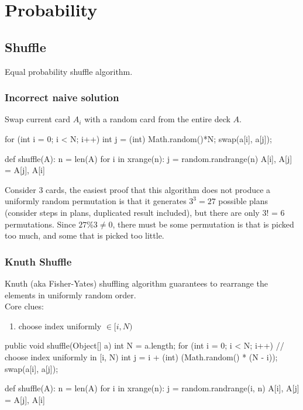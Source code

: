 \chapter{Probability}


\section{Shuffle}
Equal probability shuffle algorithm.

\subsection{Incorrect naive solution}
Swap current card $A_i$ with a random card from the entire deck $A$. 
\begin{java}
for (int i = 0; i < N; i++) {
   int j = (int) Math.random()*N;
   swap(a[i], a[j]);
}
\end{java}
\begin{python}
def shuffle(A):
  n = len(A)
  for i in xrange(n):
    j = random.randrange(n)
    A[i], A[j] = A[j], A[i]
\end{python}
Consider 3 cards, the easiest proof that this algorithm does not produce a uniformly random permutation is that it generates $3^3=27$ possible plans (consider steps in plans, duplicated result included), but there are only 3! = 6 permutations. Since $27\%3 \neq 0$, there must be some permutation is that is picked too much, and some that is picked too little.
\subsection{Knuth Shuffle}
Knuth (aka Fisher-Yates) shuffling algorithm guarantees to rearrange the elements in uniformly random order. 
\\
Core clues:
\begin{enumerate}
\item choose index uniformly $\in [i, N)$
\end{enumerate}
\begin{java}
public void shuffle(Object[] a) {
    int N = a.length;
    for (int i = 0; i < N; i++) {
        // choose index uniformly in [i, N)
        int j = i + (int) (Math.random() * (N - i));
        swap(a[i], a[j]);
    }
}
\end{java}

\begin{python}
def shuffle(A):
  n = len(A)
  for i in xrange(n):
    j = random.randrange(i, n)
    A[i], A[j] = A[j], A[i]
\end{python}
